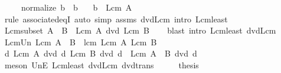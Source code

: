 \begin{isabellebody}
\ \ \ \ \ {\isachardoublequoteopen}normalize\ b\ {\isacharequal}{\kern0pt}\ b{\isachardoublequoteclose}\isanewline
\ \ \ {\isachardoublequoteopen}b\ {\isacharequal}{\kern0pt}\ Lcm\ A{\isachardoublequoteclose}\isanewline
%
\isadelimproof
\ \ %
\endisadelimproof
%
\isatagproof
{}\isamarkupfalse%
\ {\isacharparenleft}{\kern0pt}rule\ associated{\isacharunderscore}{\kern0pt}eqI{\isacharparenright}{\kern0pt}\ {\isacharparenleft}{\kern0pt}auto\ simp{\isacharcolon}{\kern0pt}\ assms\ dvd{\isacharunderscore}{\kern0pt}Lcm\ intro{\isacharcolon}{\kern0pt}\ Lcm{\isacharunderscore}{\kern0pt}least{\isacharparenright}{\kern0pt}%
\endisatagproof
{\isafoldproof}%
%
\isadelimproof
\isanewline
%
\endisadelimproof
\isanewline
{}\isamarkupfalse%
\ Lcm{\isacharunderscore}{\kern0pt}subset{\isacharcolon}{\kern0pt}\ {\isachardoublequoteopen}A\ {\isasymsubseteq}\ B\ {\isasymLongrightarrow}\ Lcm\ A\ dvd\ Lcm\ B{\isachardoublequoteclose}\isanewline
%
\isadelimproof
\ \ %
\endisadelimproof
%
\isatagproof
{}\isamarkupfalse%
\ {\isacharparenleft}{\kern0pt}blast\ intro{\isacharcolon}{\kern0pt}\ Lcm{\isacharunderscore}{\kern0pt}least\ dvd{\isacharunderscore}{\kern0pt}Lcm{\isacharparenright}{\kern0pt}%
\endisatagproof
{\isafoldproof}%
%
\isadelimproof
\isanewline
%
\endisadelimproof
\isanewline
{}\isamarkupfalse%
\ Lcm{\isacharunderscore}{\kern0pt}Un{\isacharcolon}{\kern0pt}\ {\isachardoublequoteopen}Lcm\ {\isacharparenleft}{\kern0pt}A\ {\isasymunion}\ B{\isacharparenright}{\kern0pt}\ {\isacharequal}{\kern0pt}\ lcm\ {\isacharparenleft}{\kern0pt}Lcm\ A{\isacharparenright}{\kern0pt}\ {\isacharparenleft}{\kern0pt}Lcm\ B{\isacharparenright}{\kern0pt}{\isachardoublequoteclose}\isanewline
%
\isadelimproof
%
\endisadelimproof
%
\isatagproof
{}\isamarkupfalse%
\ {\isacharminus}{\kern0pt}\isanewline
\ \ \isamarkupfalse%
\ {\isachardoublequoteopen}{\isasymAnd}d{\isachardot}{\kern0pt}\ {\isasymlbrakk}Lcm\ A\ dvd\ d{\isacharsemicolon}{\kern0pt}\ Lcm\ B\ dvd\ d{\isasymrbrakk}\ {\isasymLongrightarrow}\ Lcm\ {\isacharparenleft}{\kern0pt}A\ {\isasymunion}\ B{\isacharparenright}{\kern0pt}\ dvd\ d{\isachardoublequoteclose}\isanewline
\ \ \ \ \isamarkupfalse%
\ {\isacharparenleft}{\kern0pt}meson\ UnE\ Lcm{\isacharunderscore}{\kern0pt}least\ dvd{\isacharunderscore}{\kern0pt}Lcm\ dvd{\isacharunderscore}{\kern0pt}trans{\isacharparenright}{\kern0pt}\isanewline
\ \ \isamarkupfalse%
\ \isamarkupfalse%
\ {\isacharquery}{\kern0pt}thesis\isanewline

\end{isabellebody}
